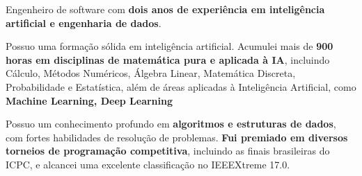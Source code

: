 \documentclass[a4paper,12pt]{article}
\begin{document}



Engenheiro de software com \textbf{dois anos de experiência em inteligência artificial e engenharia de dados}.

Possuo uma formação sólida em inteligência artificial. Acumulei mais de \textbf{900 horas em disciplinas de matemática pura e aplicada à IA}, incluindo Cálculo, Métodos Numéricos, Álgebra Linear, Matemática Discreta, Probabilidade e Estatística, além de áreas aplicadas à Inteligência Artificial, como \textbf{Machine Learning, Deep Learning}

Possuo um conhecimento profundo em \textbf{algoritmos e estruturas de dados}, com fortes habilidades de resolução de problemas. \textbf{Fui premiado em diversos torneios de programação competitiva}, incluindo as finais brasileiras do ICPC, e alcancei uma excelente classificação no IEEEXtreme 17.0.
\end{document}
